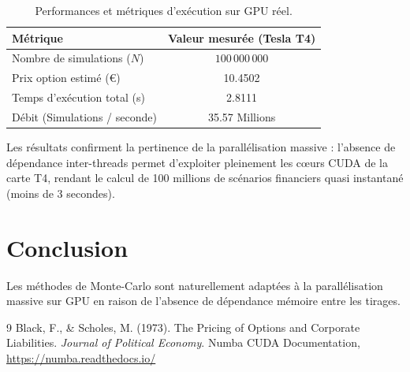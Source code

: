 \documentclass[12pt,a4paper]{article}
\begin{document}
\begin{table}[h!]
\centering
\begin{tabular}{|l|c|}
\hline
\textbf{Métrique} & \textbf{Valeur mesurée (Tesla T4)} \\ \hline
Nombre de simulations (\(N\)) & \(100\,000\,000\) \\ \hline
Prix option estimé (€) & 10.4502 \\ \hline
Temps d'exécution total (s) & 2.8111 \\ \hline
Débit (Simulations / seconde) & 35.57 Millions \\ \hline
\end{tabular}
\caption{Performances et métriques d'exécution sur GPU réel.}
\end{table}

Les résultats confirment la pertinence de la parallélisation massive : l'absence de dépendance inter-threads permet d'exploiter pleinement les cœurs CUDA de la carte T4, rendant le calcul de 100 millions de scénarios financiers quasi instantané (moins de 3 secondes).

\section{Conclusion}
Les méthodes de Monte-Carlo sont naturellement adaptées à la parallélisation massive sur GPU en raison de l'absence de dépendance mémoire entre les tirages.

\begin{thebibliography}{9}
 Black, F., \& Scholes, M. (1973). The Pricing of Options and Corporate Liabilities. \textit{Journal of Political Economy}.
 Numba CUDA Documentation, \url{https://numba.readthedocs.io/}
\end{thebibliography}
\end{document}
